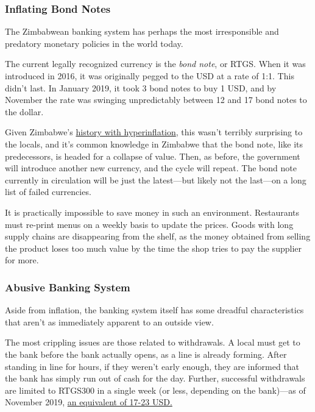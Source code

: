 \documentclass{article}
\begin{document}
\subsubsection{Inflating Bond Notes} \label{inflation}

The Zimbabwean banking system has perhaps the most irresponsible and predatory monetary policies in the world today.

The current legally recognized currency is the \textit{bond note}, or RTGS. When it was introduced in 2016, it was originally pegged to the USD at a rate of 1:1. This didn't last. In January 2019, it took 3 bond notes to buy 1 USD, and by November the rate was swinging unpredictably between 12 and 17 bond notes to the dollar.

Given Zimbabwe's \href{https://en.wikipedia.org/wiki/Hyperinflation_in_Zimbabwe}{history with hyperinflation}, this wasn't terribly surprising to the locals, and it's common knowledge in Zimbabwe that the bond note, like its predecessors, is headed for a collapse of value. Then, as before, the government will introduce another new currency, and the cycle will repeat. The bond note currently in circulation will be just the latest---but likely not the last---on a long list of failed currencies.

It is practically impossible to save money in such an environment. Restaurants must re-print menus on a weekly basis to update the prices. Goods with long supply chains are disappearing from the shelf, as the money obtained from selling the product loses too much value by the time the shop tries to pay the supplier for more.

\subsubsection{Abusive Banking System} \label{banking}

Aside from inflation, the banking system itself has some dreadful characteristics that aren't as immediately apparent to an outside view.

The most crippling issues are those related to withdrawals. A local must get to the bank before the bank actually opens, as a line is already forming. After standing in line for hours, if they weren't early enough, they are informed that the bank has simply run out of cash for the day. Further, successful withdrawals are limited to RTGS300 in a single week (or less, depending on the bank)---as of November 2019, \href{https://www.reuters.com/article/us-zimbabwe-economy-idUSKBN1XM14U}{an equivalent of 17-23 USD.}
\end{document}

